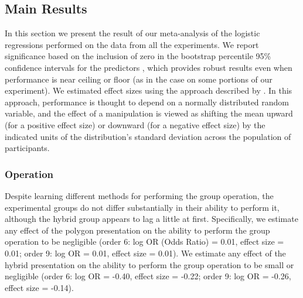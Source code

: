 \documentclass[man,10pt]{apa6}
\begin{document}
\subsection{Main Results}
In this section we present the result of our meta-analysis of the logistic regressions performed on the data from all the experiments. We report significance based on the inclusion of zero in the bootstrap percentile 95\% confidence intervals for the predictors \cite{Wasserman2006,Gong1986}, which provides robust results even when performance is near ceiling or floor (as in the case on some portions of our experiment). We estimated effect sizes using the approach described by . In this approach, performance is thought to depend on a normally distributed random variable, and the effect of a manipulation is viewed as shifting the mean upward (for a positive effect size) or downward (for a negative effect size) by the indicated units of the distribution's standard deviation across the population of participants.  
\subsubsection{Operation}
Despite learning different methods for performing the group operation, the experimental groups do not differ substantially in their ability to perform it, although the hybrid group appears to lag a little at first. Specifically, we estimate any effect of the polygon presentation on the ability to perform the group operation to be negligible (order 6: log OR (Odds Ratio) = 0.01, effect size = 0.01; order 9: log OR = 0.01, effect size = 0.01). We estimate any effect of the hybrid presentation on the ability to perform the group operation to be small or negligible (order 6: log OR = -0.40, effect size = -0.22; order 9: log OR = -0.26, effect size = -0.14).\par 
\end{document}
